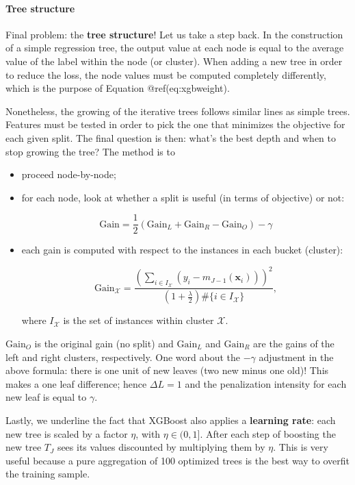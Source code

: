 \paragraph{Tree structure}

Final problem: the \textbf{tree structure}! Let us take a step back. In the construction of a simple regression tree, the output value at each node is equal to the average value of the label within the node (or cluster). When adding a new tree in order to reduce the loss, the node values must be computed completely differently, which is the purpose of Equation @ref(eq:xgbweight).

Nonetheless, the growing of the iterative trees follows similar lines as simple trees. Features must be tested in order to pick the one that minimizes the objective for each given split. The final question is then: what's the best depth and when to stop growing the tree? The method is to

\begin{itemize}
\item proceed node-by-node;
\item for each node, look at whether a split is useful (in terms of objective) or not:

\begin{equation}
\text{Gain}=\frac{1}{2}\left(\text{Gain}_L+\text{Gain}_R-\text{Gain}_O \right)-\gamma
\end{equation}


\item each gain is computed with respect to the instances in each bucket (cluster):

\begin{equation}
\text{Gain}_\mathcal{X}= \frac{\left(\sum_{i\in I_\mathcal{X}}(y_i -m_{J-1}(\mathbf{x}_i))\right)^2}{\left(1+\frac{\lambda}{2}\right)\#\{i\in I_\mathcal{X}\}},
\end{equation}


where $I_\mathcal{X}$ is the set of instances within cluster $\mathcal{X}$.
\end{itemize}

$\text{Gain}_O$ is the original gain (no split) and $\text{Gain}_L$ and $\text{Gain}_R$ are the gains of the left and right clusters, respectively. One word about the $-\gamma$ adjustment in the above formula: there is one unit of new leaves (two new minus one old)! This makes a one leaf difference; hence $\Delta L =1$ and the penalization intensity for each new leaf is equal to $\gamma$.

Lastly, we underline the fact that XGBoost also applies a \textbf{learning rate}: each new tree is scaled by a factor $\eta$, with $\eta \in (0,1]$. After each step of boosting the new tree $T_J$ sees its values discounted by multiplying them by $\eta$. This is very useful because a pure aggregation of 100 optimized trees is the best way to overfit the training sample.

